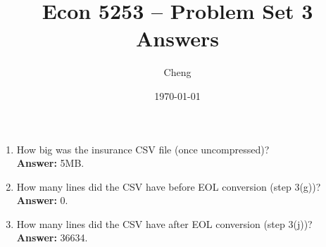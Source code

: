 \documentclass[12pt]{article}
\begin{document}
\title{Econ 5253 -- Problem Set 3 Answers}
\author{Cheng}
\date{\today}
\maketitle

\begin{enumerate}
  \item How big was the insurance CSV file (once uncompressed)?\\
  \textbf{Answer:} 5MB.

  \item How many lines did the CSV have before EOL conversion (step 3(g))?\\
  \textbf{Answer:} 0.

  \item How many lines did the CSV have after EOL conversion (step 3(j))?\\
  \textbf{Answer:} 36634.
\end{enumerate}
\end{document}
